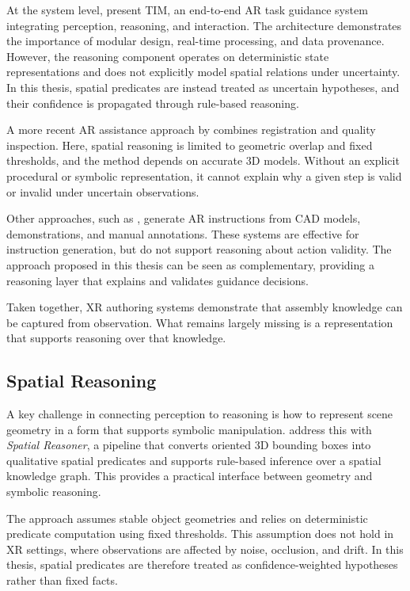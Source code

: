 \documentclass[11pt,titlepage,openright]{book}
\begin{document}
At the system level, \citet{McGowan2025TIM} present TIM, an end-to-end AR task guidance system integrating perception, reasoning, and interaction. The architecture demonstrates the importance of modular design, real-time processing, and data provenance. However, the reasoning component operates on deterministic state representations and does not explicitly model spatial relations under uncertainty. In this thesis, spatial predicates are instead treated as uncertain hypotheses, and their confidence is propagated through rule-based reasoning.

A more recent AR assistance approach by \citet{Li2024DeepLearningARAssembly} combines registration and quality inspection. Here, spatial reasoning is limited to geometric overlap and fixed thresholds, and the method depends on accurate 3D models. Without an explicit procedural or symbolic representation, it cannot explain why a given step is valid or invalid under uncertain observations.

Other approaches, such as \citet{Lin2025ARAIAG}, generate AR instructions from CAD models, demonstrations, and manual annotations. These systems are effective for instruction generation, but do not support reasoning about action validity. The approach proposed in this thesis can be seen as complementary, providing a reasoning layer that explains and validates guidance decisions.

Taken together, XR authoring systems demonstrate that assembly knowledge can be captured from observation. What remains largely missing is a representation that supports reasoning over that knowledge.



\subsection{Spatial Reasoning}
\label{sec:spatial-reasoning}

A key challenge in connecting perception to reasoning is how to represent scene geometry in a form that supports symbolic manipulation. \citet{Haesler_2025} address this with \emph{Spatial Reasoner}, a pipeline that converts oriented 3D bounding boxes into qualitative spatial predicates and supports rule-based inference over a spatial knowledge graph. This provides a practical interface between geometry and symbolic reasoning.

The approach assumes stable object geometries and relies on deterministic predicate computation using fixed thresholds. This assumption does not hold in XR settings, where observations are affected by noise, occlusion, and drift. In this thesis, spatial predicates are therefore treated as confidence-weighted hypotheses rather than fixed facts.
\end{document}

